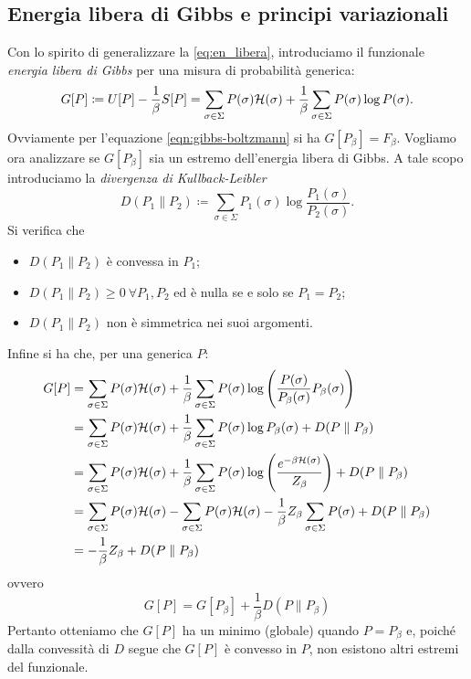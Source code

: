 \subsection{Energia libera di Gibbs e principi variazionali}
Con lo spirito di generalizzare la \eqref{eq:en_libera}, introduciamo il funzionale \emph{energia libera di Gibbs} per una misura di probabilità generica:
\begin{equation}
    G[P] \coloneqq U[P] - \frac{1}{\beta} S[P] = \sum_{\sigma\in\Sigma} P(\sigma)\mathcal{H}(\sigma) + \frac{1}{\beta}\sum_{\sigma\in\Sigma} P(\sigma) \log{P(\sigma)}.
\end{equation}
Ovviamente per l'equazione \eqref{eqn:gibbs-boltzmann} si ha $ G[P_\beta] = F_\beta $. Vogliamo ora analizzare se $ G[P_\beta] $ sia un estremo dell'energia libera di Gibbs. A tale scopo introduciamo la \emph{divergenza di Kullback-Leibler}
\begin{equation}
    D(P_1 \parallel P_2) \coloneqq \sum_{\sigma\in\Sigma} P_1(\sigma) \log{\frac{P_1(\sigma)}{P_2(\sigma)}}.
\end{equation}
Si verifica che
\begin{itemize}
    \item $ D(P_1 \parallel P_2) $ è convessa in $ P_1 $;
    \item $ D(P_1 \parallel P_2) \geq 0 \ \forall P_1, P_2 $ ed è nulla se e solo se $ P_1 = P_2 $;
    \item $ D(P_1 \parallel P_2) $ non è simmetrica nei suoi argomenti.
\end{itemize}
Infine si ha che, per una generica $ P $:
\begin{align*}
	G[P] & = \sum_{\sigma\in\Sigma} P(\sigma)\mathcal{H}(\sigma) + \frac{1}{\beta}\sum_{\sigma\in\Sigma} P(\sigma) \log{\left(\frac{P(\sigma)}{P_\beta(\sigma)} P_\beta(\sigma)\right)}                \\
	     & = \sum_{\sigma\in\Sigma} P(\sigma)\mathcal{H}(\sigma) + \frac{1}{\beta}\sum_{\sigma\in\Sigma} P(\sigma) \log{P_\beta(\sigma)} + D(P \parallel P_\beta)                                      \\
	     & = \sum_{\sigma\in\Sigma} P(\sigma)\mathcal{H}(\sigma) + \frac{1}{\beta}\sum_{\sigma\in\Sigma} P(\sigma) \log{\left(\frac{e^{-\beta \mathcal{H}(\sigma)}}{Z_\beta}\right)} + D(P \parallel P_\beta) \\
	     & = \sum_{\sigma\in\Sigma} P(\sigma)\mathcal{H}(\sigma) - \sum_{\sigma\in\Sigma} P(\sigma)\mathcal{H}(\sigma) - \frac{1}{\beta} Z_\beta \sum_{\sigma\in\Sigma} P(\sigma) + D(P \parallel P_\beta)    \\
	     & = -\frac{1}{\beta} Z_\beta + D(P \parallel P_\beta)
\end{align*}
ovvero
\begin{equation}
     G[P] = G[P_\beta] + \frac{1}{\beta} D(P \parallel P_\beta)
\end{equation}
Pertanto otteniamo che $ G[P] $ ha un minimo (globale) quando $ P = P_\beta $ e, poiché dalla convessità di $ D $ segue che $ G[P] $ è convesso in $ P $, non esistono altri estremi del funzionale. \\

